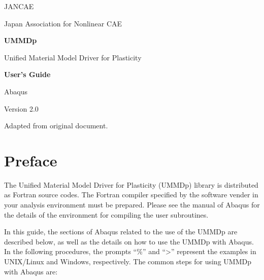 \documentclass[11pt,a4paper,twoside,final,onecolumn,titlepage]{article}
\begin{document}
\begin{titlepage}
\LARGE JANCAE

\large Japan Association for Nonlinear CAE

\vspace*{150pt}
\Huge \textbf{UMMDp}

\vspace*{10pt}
\LARGE Unified Material Model Driver for Plasticity

\vspace*{50pt}
\begin{flushright}
\Huge \textbf{User's Guide}

\LARGE Abaqus
\end{flushright}

\vspace*{50pt}
\begin{center}

\vspace*{180pt}
\large Version 2.0

\large Adapted from original document.

\end{center}
\end{titlepage}

\tableofcontents

\newpage
\section{Preface}

The Unified Material Model Driver for Plasticity (UMMDp) library is distributed as Fortran source codes. The Fortran compiler specified by the software vender in your analysis environment must be prepared. Please see the manual of Abaqus for the details of the environment for compiling the user subroutines. 

In this guide, the sections of Abaqus related to the use of the UMMDp are described below, as well as the details on how to use the UMMDp with Abaqus. In the following procedures, the prompts “\%” and “\textgreater ” represent the examples in UNIX/Linux and Windows, respectively. The common steps for using UMMDp with Abaqus are:
\end{document}
